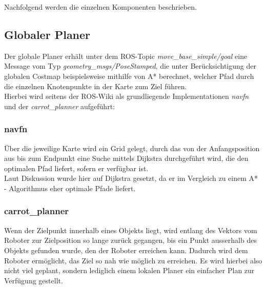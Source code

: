 \documentclass[oribibl]{llncs}
\begin{document}
Nachfolgend werden die einzelnen Komponenten beschrieben.

\subsection{Globaler Planer}
Der globale Planer erhält unter dem ROS-Topic \textit{move\_base\_simple/goal} eine Message vom Typ \textit{geometry\_msgs/PoseStamped}, die unter Berücksichtigung der globalen Costmap beispielsweise mithilfe von A* berechnet, welcher Pfad durch die einzelnen Knotenpunkte in der Karte zum Ziel führen.\\
Hierbei wird seitens der ROS-Wiki als grundliegende Implementationen \textit{navfn} und der \textit{carrot\_planner} aufgeführt:
\subsubsection{navfn}
Über die jeweilige Karte wird ein Grid gelegt, durch das von der Anfangsposition aus bis zum Endpunkt eine Suche mittels Dijkstra durchgeführt wird, die den optimalen Pfad liefert, sofern er verfügbar ist.\\
Laut Diskussion wurde hier auf Dijkstra gesetzt, da er im Vergleich zu einem A* - Algorithmus eher optimale Pfade liefert. \cite{navfn}
\subsubsection{carrot\_planner}
Wenn der Zielpunkt innerhalb eines Objekts liegt, wird entlang des Vektors vom Roboter zur Zielposition so lange zurück gegangen, bis ein Punkt ausserhalb des Objekts gefunden wurde, den der Roboter erreichen kann. Dadurch wird dem Roboter ermöglicht, das Ziel so nah wie möglich zu erreichen. Es wird hierbei also nicht viel geplant, sondern lediglich einem lokalen Planer ein einfacher Plan zur Verfügung gestellt. \cite{carrotPlanner}
\end{document}
